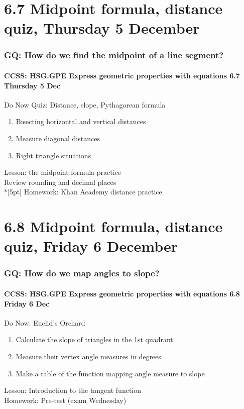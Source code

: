 \documentclass{beamer}
\begin{document}
  \section{6.7 Midpoint formula, distance quiz, Thursday 5 December}
  \frame
  {
    \frametitle{GQ: How do we find the midpoint of a line segment?}
    \framesubtitle{CCSS: HSG.GPE Express geometric properties with equations \hfill \alert{6.7 Thursday 5 Dec}}

    \begin{block}{Do Now Quiz: Distance, slope, Pythagorean formula}
    \begin{enumerate}
      \item Bisecting horizontal and vertical distances
      \item Measure diagonal distances
      \item Right triangle situations
    \end{enumerate}
    \end{block}
    Lesson: the midpoint formula practice\\
    Review rounding and decimal places \\*[5pt]
    Homework: Khan Academy distance practice
  }

  \section{6.8 Midpoint formula, distance quiz, Friday 6 December}
  \frame
  {
    \frametitle{GQ: How do we map angles to slope?}
    \framesubtitle{CCSS: HSG.GPE Express geometric properties with equations \hfill \alert{6.8 Friday 6 Dec}}

    \begin{block}{Do Now: Euclid's Orchard}
    \begin{enumerate}
      \item Calculate the slope of triangles in the 1st quadrant
      \item Measure their vertex angle measures in degrees
      \item Make a table of the function mapping angle measure to slope
    \end{enumerate}
    \end{block}
    Lesson: Introduction to the tangent function \\
    Homework: Pre-test (\alert{exam Wednesday})
  }
\end{document}
